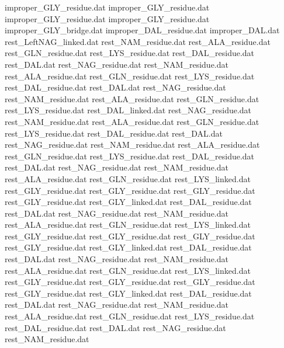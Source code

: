 improper_GLY_residue.dat
improper_GLY_residue.dat
improper_GLY_residue.dat
improper_GLY_residue.dat
improper_GLY_bridge.dat
improper_DAL_residue.dat        
improper_DAL.dat                
rest_LeftNAG_linked.dat         
rest_NAM_residue.dat            
rest_ALA_residue.dat            
rest_GLN_residue.dat            
rest_LYS_residue.dat            
rest_DAL_residue.dat            
rest_DAL.dat                    
rest_NAG_residue.dat            
rest_NAM_residue.dat            
rest_ALA_residue.dat            
rest_GLN_residue.dat            
rest_LYS_residue.dat            
rest_DAL_residue.dat            
rest_DAL.dat                    
rest_NAG_residue.dat            
rest_NAM_residue.dat            
rest_ALA_residue.dat            
rest_GLN_residue.dat            
rest_LYS_residue.dat            
rest_DAL_linked.dat             
rest_NAG_residue.dat            
rest_NAM_residue.dat            
rest_ALA_residue.dat            
rest_GLN_residue.dat            
rest_LYS_residue.dat            
rest_DAL_residue.dat            
rest_DAL.dat                    
rest_NAG_residue.dat            
rest_NAM_residue.dat            
rest_ALA_residue.dat            
rest_GLN_residue.dat            
rest_LYS_residue.dat            
rest_DAL_residue.dat            
rest_DAL.dat                    
rest_NAG_residue.dat            
rest_NAM_residue.dat            
rest_ALA_residue.dat            
rest_GLN_residue.dat            
rest_LYS_linked.dat             
rest_GLY_residue.dat
rest_GLY_residue.dat
rest_GLY_residue.dat
rest_GLY_residue.dat
rest_GLY_linked.dat
rest_DAL_residue.dat            
rest_DAL.dat                    
rest_NAG_residue.dat            
rest_NAM_residue.dat            
rest_ALA_residue.dat            
rest_GLN_residue.dat            
rest_LYS_linked.dat             
rest_GLY_residue.dat
rest_GLY_residue.dat
rest_GLY_residue.dat
rest_GLY_residue.dat
rest_GLY_linked.dat
rest_DAL_residue.dat            
rest_DAL.dat                    
rest_NAG_residue.dat            
rest_NAM_residue.dat            
rest_ALA_residue.dat            
rest_GLN_residue.dat            
rest_LYS_linked.dat             
rest_GLY_residue.dat
rest_GLY_residue.dat
rest_GLY_residue.dat
rest_GLY_residue.dat
rest_GLY_linked.dat
rest_DAL_residue.dat            
rest_DAL.dat                    
rest_NAG_residue.dat            
rest_NAM_residue.dat            
rest_ALA_residue.dat            
rest_GLN_residue.dat            
rest_LYS_residue.dat            
rest_DAL_residue.dat            
rest_DAL.dat                    
rest_NAG_residue.dat            
rest_NAM_residue.dat            
